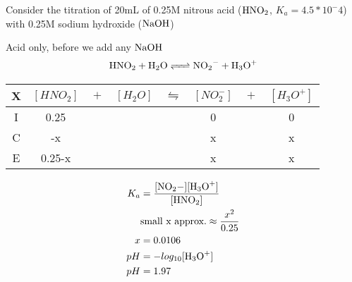 \documentclass[../CHEM152Notes.tex]{subfiles}
\begin{document}
\begin{exmp}
    Consider the titration of 20mL of 0.25M nitrous acid ($\ce{HNO2}$, $K_a = 4.5*10^-4$) with 0.25M sodium hydroxide ($\ce{NaOH}$)
\end{exmp}
Acid only, before we add any $\ce{NaOH}$
\begin{equation*}
    \begin{aligned}
        \ce{HNO2 + H2O <=> NO2- + H3O+}
    \end{aligned}
\end{equation*}
\newline
\begin{tabular}{c|c@{}c@{}c@{}c@{}c@{}c@{}c}
    \hline
    X   & $[HNO_2]$ & ${}+{}$ & $[H_2O]$ & ${}\leftrightharpoons{}$ & $[NO_2^-]$ & ${}+{}$ & $[H_3O^+]$ \\
    \hline
    I   &  0.25   &&     &&  0   && 0  \\
    C   &  -x  &&     &&  x  && x \\
    E   & 0.25-x &&     &&  x  && x \\      
\end{tabular}
\newline
\begin{equation*}
    \begin{aligned}
        K_a &= \ce{\frac{[NO2-][H3O+]}{[HNO2]}} \\
            &\text{small x approx.} \approx \frac{x^2}{0.25} \\
          x &= 0.0106 \\
        pH &= -log_{10}\ce{[H3O+]} \\
        pH &= 1.97
    \end{aligned}
\end{equation*}
\end{document}
